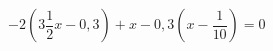 \begin{ex}
	\begin{condition}
		\( -2\left( 3\dfrac{1}{2}x-0,3 \right)+x-0,3\left( x-\dfrac{1}{10} \right)=0 \)
	\end{condition}
\end{ex}